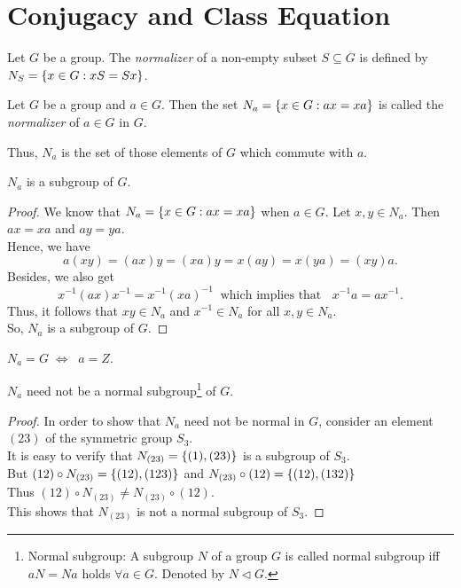 \documentclass[../main-sheet.tex]{subfiles}
\begin{document}
\chapter{Conjugacy and Class Equation}
\begin{defn}
    Let \(G\) be a group. The \emph{normalizer} of a non-empty subset \(S\subseteq G\) is defined by \(N_S=\left\{x\in G: xS=Sx\right\}\).
\end{defn}
\begin{defn}
    Let \(G\) be a group and \(a\in G\). Then the set \(N_a=\left\{x\in G: ax=xa\right\}\) is called the \emph{normalizer} of \(a\in G\) in \(G\).
\end{defn}
Thus, \(N_a\) is the set of those elements of \(G\) which commute with \(a\).
\begin{ex}
    \(N_a\) is a subgroup of \(G\).
\end{ex}
\begin{proof}
    We know that \(N_a=\left\{x\in G : ax=xa\right\}\) when \(a\in G\). Let \(x,y\in N_a\). Then \(ax=xa\) and \(ay=ya\).\\
    Hence, we have
    \[a(xy)=(ax)y=(xa)y=x(ay)=x(ya)=(xy)a.\]
    Besides, we also get
    \[x^{-1}(ax)x^{-1}=x^{-1}(xa)^{-1}\;\; \text{which implies that }\;\; x^{-1}a=ax^{-1}.\]
    Thus, it follows that \(xy\in N_a\) and \(x^{-1}\in N_a\) for all \(x,y\in N_a\).\\
    So, \(N_a\) is a subgroup of \(G\).
\end{proof}
\begin{note}
    \(N_a=G\;\Leftrightarrow\;\;a=Z\).
\end{note}
\begin{ex}
    \(N_a\) need not be a normal subgroup\footnote{Normal subgroup: A subgroup \(N\) of a group \(G\) is called normal subgroup iff \(aN=Na\) holds \(\forall a\in G\). Denoted by \(N\triangleleft G\). } of \(G\).
\end{ex}
\begin{proof}
    In order to show that \(N_a\) need not be normal in \(G\), consider an element \((2 3) \) of the symmetric group \(S_3\).\\
    It is easy to verify that \(N_{(2 3)}=\left\{(1),(2 3)\right\}\) is a subgroup of \(S_3\).\\
    But \((1 2)\circ N_{(2 3)}=\left\{(1 2),(1 2 3)\right\}\) and \(N_{(2 3)}\circ (1 2)=\left\{(1 2),(1 3 2)\right\}\)\\
    Thus    \((1 2)\circ N_{(2 3)}\neq N_{(2 3)}\circ (1 2)\).\\
    This shows that \(N_{(2 3)}\) is not a normal subgroup of \(S_3\).
\end{proof}
\end{document}
